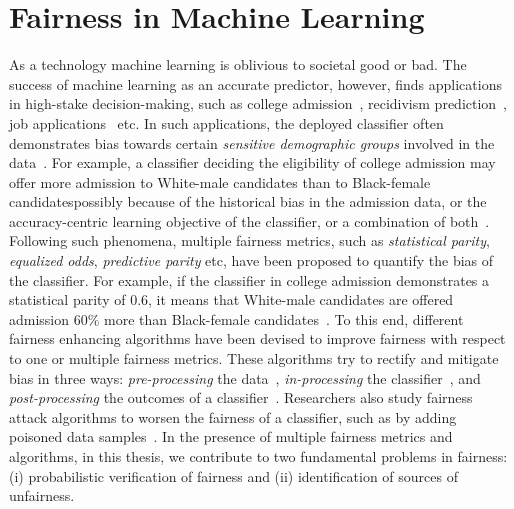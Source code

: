 \section{Fairness in Machine Learning}
As a technology machine learning is oblivious to societal good or bad. The success of machine learning as an accurate predictor, however, finds applications in high-stake decision-making, such as college admission~\cite{martinez2021using}, recidivism prediction~\cite{tollenaar2013method}, job applications~\cite{ajunwa2016hiring} etc. In such applications, the deployed  classifier often demonstrates bias towards certain \emph{sensitive demographic groups} involved in the data~\cite{dwork2012fairness}. For example, a classifier deciding the eligibility of college admission may offer more admission to White-male candidates than to Black-female candidates\textemdash possibly because of the historical bias in the admission data, or the accuracy-centric learning objective of the classifier, or a combination of both~\cite{berk2019accuracy,landy1978correlates,zliobaite2015relation}. Following such phenomena, multiple fairness metrics, such as \textit{statistical parity}, \textit{equalized odds}, \textit{predictive parity} etc, have been proposed to quantify the bias of the classifier. For example, if the classifier in college admission demonstrates a {statistical parity} of $ 0.6 $, it means that White-male candidates are offered admission $ 60\% $ more than Black-female candidates~\cite{besse2021survey,feldman2015certifying,garg2020fairness}. To this end, different fairness enhancing algorithms have been devised to improve fairness with respect to one or multiple fairness metrics. These algorithms try to rectify and mitigate bias in three ways: \textit{pre-processing} the data~\cite{kamiran2012data,zemel2013learning,calmon2017optimized}, \textit{in-processing} the classifier~\cite{zhang2018mitigating}, and \textit{post-processing} the outcomes of a classifier~\cite{kamiran2012decision,hardt2016equality}. Researchers also study fairness attack algorithms to worsen the fairness of a classifier, such as by adding poisoned data samples~\cite{solans2020poisoning}. In the presence of multiple fairness metrics and algorithms, in this thesis, we contribute to two fundamental problems in fairness: (i) probabilistic verification of fairness and (ii) identification of sources of unfairness.


